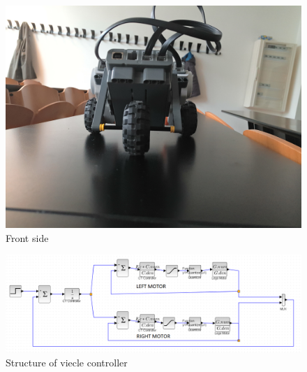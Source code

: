 \documentclass[a4paper,12pt,oneside]{article}
\begin{document}
\begin{figure}
	\centering
	\includegraphics[width=\columnwidth]{nxtImages/3.jpg}
	\caption{Front side}
	\label{fig:front}
\end{figure}
\begin{figure}
	\centering
	\includegraphics[width=\columnwidth]{vehicle.png}
	\caption{Structure of viecle controller}
	\label{fig:diagram}
\end{figure}
\end{document}
